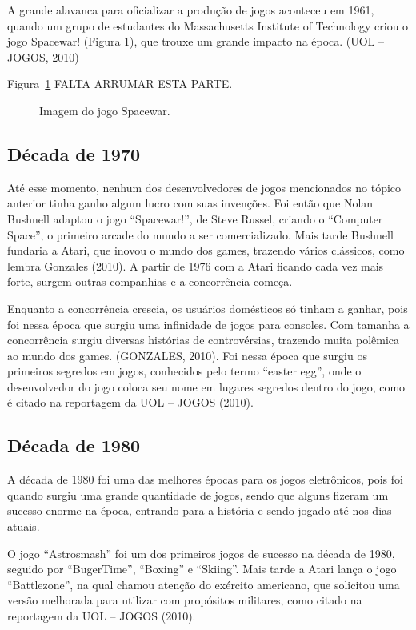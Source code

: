 A grande alavanca para oficializar a produção de jogos aconteceu em 1961, quando um grupo de estudantes do Massachusetts Institute of Technology criou o jogo Spacewar! (Figura 1), que trouxe um grande impacto na época. (UOL – JOGOS, 2010)

Figura~\ref{f1.1} FALTA ARRUMAR ESTA PARTE.
\begin{figure}[!hbp]
\makebox[\textwidth]{\framebox[5cm]{\rule{0pt}{5cm}}}
\caption{Imagem do jogo Spacewar.} \label{f1.1}
\end{figure}

\subsection{Década de 1970}

Até esse momento, nenhum dos desenvolvedores de jogos mencionados no tópico anterior tinha ganho algum lucro com suas invenções. Foi então que Nolan Bushnell adaptou o jogo “Spacewar!”, de Steve Russel, criando o “Computer Space”, o primeiro arcade do mundo a ser comercializado. Mais tarde Bushnell fundaria a Atari, que inovou o mundo dos games, trazendo vários clássicos, como lembra Gonzales (2010). A partir de 1976 com a Atari ficando cada vez mais forte, surgem outras companhias e a concorrência começa.

Enquanto a concorrência crescia, os usuários domésticos só tinham a ganhar, pois foi nessa época que surgiu uma infinidade de jogos para consoles. Com tamanha a concorrência surgiu diversas histórias de controvérsias, trazendo muita polêmica ao mundo dos games. (GONZALES, 2010). Foi nessa época que surgiu os primeiros segredos em jogos, conhecidos pelo termo “easter egg”, onde o desenvolvedor do jogo coloca seu nome em lugares segredos dentro do jogo, como é citado na reportagem da UOL – JOGOS (2010).

\subsection{Década de 1980}

A década de 1980 foi uma das melhores épocas para os jogos eletrônicos, pois foi quando surgiu uma grande quantidade de jogos, sendo que alguns fizeram um sucesso enorme na época, entrando para a história e sendo jogado até nos dias atuais.

O jogo “Astrosmash” foi um dos primeiros jogos de sucesso na década de 1980, seguido por “BugerTime”, “Boxing” e “Skiing”. Mais tarde a Atari lança o jogo “Battlezone”, na qual chamou atenção do exército americano, que solicitou uma versão melhorada para utilizar com propósitos militares, como citado na reportagem da UOL – JOGOS (2010).

